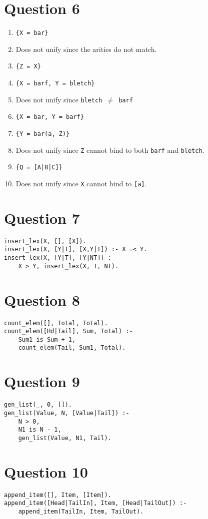 \documentclass[13pt]{article}
\begin{document}
\section*{Question 6}
\begin{enumerate}[label=(\alph*)]
\item \texttt{\{X = bar\}}
\item Does not unify since the arities do not match.
\item \texttt{\{Z = X\}}
\item \texttt{\{X = barf, Y = bletch\}}
\item Does not unify since \texttt{bletch $\neq$ barf}
\item \texttt{\{X = bar, Y = barf\}}
\item \texttt{\{Y = bar(a, Z)\}}
\item Does not unify since \texttt{Z} cannot bind to both \texttt{barf} and \texttt{bletch}.
\item \texttt{\{Q = [A|B|C]\}}
\item Does not unify since \texttt{X} cannot bind to \texttt{[a]}.
\end{enumerate}


\newpage
\section*{Question 7}
\begin{verbatim}
insert_lex(X, [], [X]).
insert_lex(X, [Y|T], [X,Y|T]) :- X =< Y.
insert_lex(X, [Y|T], [Y|NT]) :-
    X > Y, insert_lex(X, T, NT).
\end{verbatim}


\newpage
\section*{Question 8}
\begin{verbatim}
count_elem([], Total, Total).
count_elem([Hd|Tail], Sum, Total) :-
    Sum1 is Sum + 1,
    count_elem(Tail, Sum1, Total).
\end{verbatim}


\newpage
\section*{Question 9}
\begin{verbatim}
gen_list(_, 0, []).
gen_list(Value, N, [Value|Tail]) :-
    N > 0,
    N1 is N - 1,
    gen_list(Value, N1, Tail).
\end{verbatim}


\newpage
\section*{Question 10}
\begin{verbatim}
append_item([], Item, [Item]).
append_item([Head|TailIn], Item, [Head|TailOut]) :-
    append_item(TailIn, Item, TailOut).
\end{verbatim}
\end{document}
